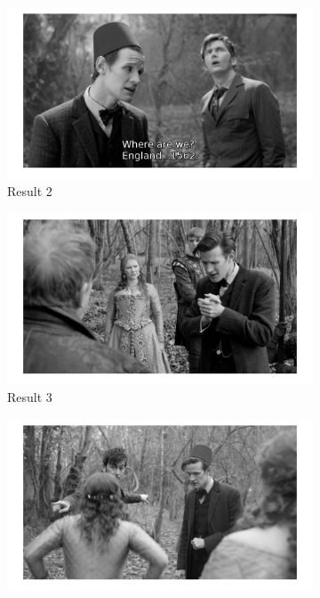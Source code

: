 \documentclass{paper}
\begin{document}
\begin{figure}
\begin{subfigure}[b]{0.32\textwidth}
  	\includegraphics[width=\textwidth]{full_frame_query_result2}
  	\caption{Result 2}
  \end{subfigure}
  \begin{subfigure}[b]{0.32\textwidth}
  	\includegraphics[width=\textwidth]{full_frame_query_result3}
  	\caption{Result 3}
  \end{subfigure}
  \begin{subfigure}[b]{0.32\textwidth}
  	\includegraphics[width=\textwidth]{full_frame_query_result4}

\end{subfigure}
\end{figure}
\end{document}
